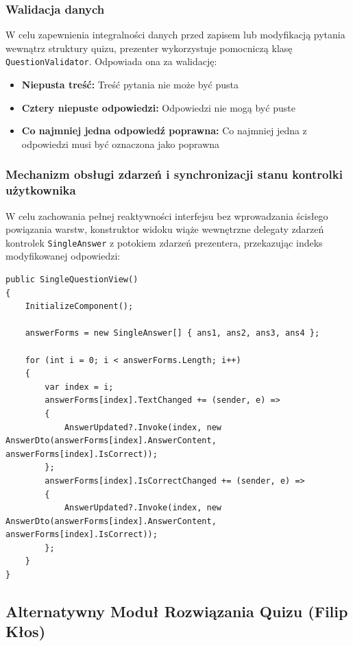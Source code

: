 \documentclass[12pt,a4paper]{article}
\begin{document}
\subsubsection{Walidacja danych}

W celu zapewnienia integralności danych przed zapisem lub modyfikacją pytania wewnątrz struktury quizu, prezenter wykorzystuje pomocniczą klasę \texttt{QuestionValidator}. Odpowiada ona za walidację:

\begin{itemize}
    \item \textbf{Niepusta treść:} Treść pytania nie może być pusta
    \item \textbf{Cztery niepuste odpowiedzi:} Odpowiedzi nie mogą być puste
    \item \textbf{Co najmniej jedna odpowiedź poprawna:} Co najmniej jedna z odpowiedzi musi być oznaczona jako poprawna
\end{itemize}

\subsubsection{Mechanizm obsługi zdarzeń i synchronizacji stanu kontrolki użytkownika}

W celu zachowania pełnej reaktywności interfejsu bez wprowadzania ścisłego powiązania warstw, konstruktor widoku wiąże wewnętrzne delegaty zdarzeń kontrolek \texttt{SingleAnswer} z potokiem zdarzeń prezentera, przekazując indeks modyfikowanej odpowiedzi:

\begin{lstlisting}[caption={Inicjalizacja kontrolek użytkownika i rejestracja zdarzeń w SingleQuestionView}]
public SingleQuestionView()
{
    InitializeComponent();

    answerForms = new SingleAnswer[] { ans1, ans2, ans3, ans4 };

    for (int i = 0; i < answerForms.Length; i++)
    {
        var index = i;
        answerForms[index].TextChanged += (sender, e) =>
        {
            AnswerUpdated?.Invoke(index, new AnswerDto(answerForms[index].AnswerContent, answerForms[index].IsCorrect));
        };
        answerForms[index].IsCorrectChanged += (sender, e) =>
        {
            AnswerUpdated?.Invoke(index, new AnswerDto(answerForms[index].AnswerContent, answerForms[index].IsCorrect));
        };
    }
}
\end{lstlisting}

\subsection{Alternatywny Moduł Rozwiązania Quizu (Filip Kłos)}
\end{document}
